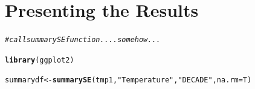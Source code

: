 \documentclass{article}\usepackage[]{graphicx}\usepackage[]{color}
\makeatletter
\newcommand{\hlstr}[1]{\textcolor[rgb]{0.192,0.494,0.8}{#1}}%
\newcommand{\hlcom}[1]{\textcolor[rgb]{0.678,0.584,0.686}{\textit{#1}}}%
\newcommand{\hlstd}[1]{\textcolor[rgb]{0.345,0.345,0.345}{#1}}%
\newcommand{\hlkwb}[1]{\textcolor[rgb]{0.69,0.353,0.396}{#1}}%
\newcommand{\hlkwc}[1]{\textcolor[rgb]{0.333,0.667,0.333}{#1}}%
\newcommand{\hlkwd}[1]{\textcolor[rgb]{0.737,0.353,0.396}{\textbf{#1}}}%
\newenvironment{kframe}{%
 \def\at@end@of@kframe{}%
 \ifinner\ifhmode%
  \def\at@end@of@kframe{\end{minipage}}%
  \begin{minipage}{\columnwidth}%
 \fi\fi%
 \def\FrameCommand##1{\hskip\@totalleftmargin \hskip-\fboxsep
 \colorbox{shadecolor}{##1}\hskip-\fboxsep
     \hskip-\linewidth \hskip-\@totalleftmargin \hskip\columnwidth}%
 \MakeFramed {\advance\hsize-\width
   \@totalleftmargin\z@ \linewidth\hsize
   \@setminipage}}%
 {\par\unskip\endMakeFramed%
 \at@end@of@kframe}
\newenvironment{knitrout}{}{} %
\makeatother
\begin{document}
\section{Presenting the Results}

\begin{knitrout}
\color{fgcolor}\begin{kframe}
\begin{alltt}
\hlcom{# call summarySE function....somehow...}


\hlkwd{library}\hlstd{(ggplot2)}

\hlstd{summarydf} \hlkwb{<-} \hlkwd{summarySE}\hlstd{(tmp1,} \hlstr{"Temperature"}\hlstd{,} \hlstr{"DECADE"}\hlstd{,} \hlkwc{na.rm}\hlstd{=T)}
\end{alltt}



\end{kframe}
\end{knitrout}
\end{document}

